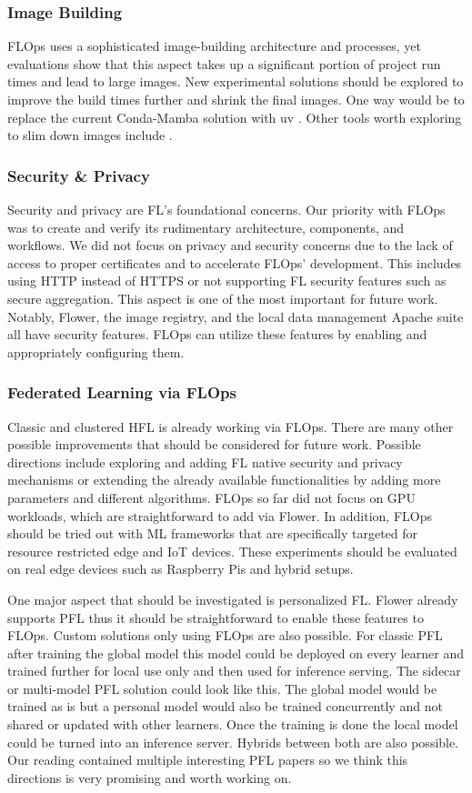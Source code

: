 \subsubsection{Image Building}
FLOps uses a sophisticated image-building architecture and processes, yet evaluations show that this aspect takes up a significant portion of project run times and lead to large images.
New experimental solutions should be explored to improve the build times further and shrink the final images.
One way would be to replace the current Conda-Mamba solution with uv \cite{uv}.
Other tools worth exploring to slim down images include \cite{slim,dragonfly,nydus}.

\subsubsection{Security \& Privacy}
Security and privacy are FL's foundational concerns.
Our priority with FLOps was to create and verify its rudimentary architecture, components, and workflows.
We did not focus on privacy and security concerns due to the lack of access to proper certificates and to accelerate FLOps' development.
This includes using HTTP instead of HTTPS or not supporting FL security features such as secure aggregation.
This aspect is one of the most important for future work.
Notably, Flower, the image registry, and the local data management Apache suite all have security features.
FLOps can utilize these features by enabling and appropriately configuring them.

\subsubsection{Federated Learning via FLOps}
Classic and clustered HFL is already working via FLOps.
There are many other possible improvements that should be considered for future work.
Possible directions include exploring and adding FL native security and privacy mechanisms or extending the already available functionalities by adding more parameters and different algorithms.
FLOps so far did not focus on GPU workloads, which are straightforward to add via Flower.
In addition, FLOps should be tried out with ML frameworks that are specifically targeted for resource restricted edge and IoT devices.
These experiments should be evaluated on real edge devices such as Raspberry Pis and hybrid setups.

One major aspect that should be investigated is personalized FL.
Flower already supports PFL thus it should be straightforward to enable these features to FLOps.
Custom solutions only using FLOps are also possible.
For classic PFL after training the global model this model could be deployed on every learner and trained further for local use only and then used for inference serving.
The sidecar or multi-model PFL solution could look like this.
The global model would be trained as is but a personal model would also be trained concurrently and not shared or updated with other learners.
Once the training is done the local model could be turned into an inference server.
Hybrids between both are also possible.
Our reading contained multiple interesting PFL papers so we think this directions is very promising and worth working on.

